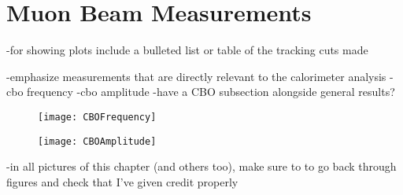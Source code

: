 \section{Muon Beam Measurements}
\label{sec:MuonBeamMeasurements}

-for showing plots include a bulleted list or table of the tracking cuts made

-emphasize measurements that are directly relevant to the calorimeter \wa analysis
-cbo frequency
-cbo amplitude
-have a CBO subsection alongside general results? 





\begin{figure}[]
    \centering
    \texttt{[image: CBOFrequency]}
    \caption[CBO frequency]{}    
    \label{fig:CBOFrequency}
\end{figure}

\begin{figure}[]
    \centering
    \texttt{[image: CBOAmplitude]}
    \caption[CBO amplitude]{}    
    \label{fig:CBOAmplitude}
\end{figure}



\clearpage


-in all pictures of this chapter (and others too), make sure to to go back through figures and check that I've given credit properly



